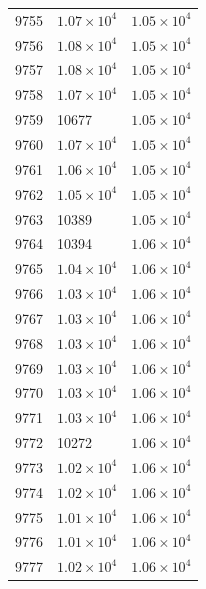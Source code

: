 \begin{table}[H]
\begin{tabular}{lll}
9755 & $\displaystyle 1.07 \times 10^{4}$ & $\displaystyle 1.05 \times 10^{4}$ \\
9756 & $\displaystyle 1.08 \times 10^{4}$ & $\displaystyle 1.05 \times 10^{4}$ \\
9757 & $\displaystyle 1.08 \times 10^{4}$ & $\displaystyle 1.05 \times 10^{4}$ \\
9758 & $\displaystyle 1.07 \times 10^{4}$ & $\displaystyle 1.05 \times 10^{4}$ \\
9759 & 10677 & $\displaystyle 1.05 \times 10^{4}$ \\
9760 & $\displaystyle 1.07 \times 10^{4}$ & $\displaystyle 1.05 \times 10^{4}$ \\
9761 & $\displaystyle 1.06 \times 10^{4}$ & $\displaystyle 1.05 \times 10^{4}$ \\
9762 & $\displaystyle 1.05 \times 10^{4}$ & $\displaystyle 1.05 \times 10^{4}$ \\
9763 & 10389 & $\displaystyle 1.05 \times 10^{4}$ \\
9764 & 10394 & $\displaystyle 1.06 \times 10^{4}$ \\
9765 & $\displaystyle 1.04 \times 10^{4}$ & $\displaystyle 1.06 \times 10^{4}$ \\
9766 & $\displaystyle 1.03 \times 10^{4}$ & $\displaystyle 1.06 \times 10^{4}$ \\
9767 & $\displaystyle 1.03 \times 10^{4}$ & $\displaystyle 1.06 \times 10^{4}$ \\
9768 & $\displaystyle 1.03 \times 10^{4}$ & $\displaystyle 1.06 \times 10^{4}$ \\
9769 & $\displaystyle 1.03 \times 10^{4}$ & $\displaystyle 1.06 \times 10^{4}$ \\
9770 & $\displaystyle 1.03 \times 10^{4}$ & $\displaystyle 1.06 \times 10^{4}$ \\
9771 & $\displaystyle 1.03 \times 10^{4}$ & $\displaystyle 1.06 \times 10^{4}$ \\
9772 & 10272 & $\displaystyle 1.06 \times 10^{4}$ \\
9773 & $\displaystyle 1.02 \times 10^{4}$ & $\displaystyle 1.06 \times 10^{4}$ \\
9774 & $\displaystyle 1.02 \times 10^{4}$ & $\displaystyle 1.06 \times 10^{4}$ \\
9775 & $\displaystyle 1.01 \times 10^{4}$ & $\displaystyle 1.06 \times 10^{4}$ \\
9776 & $\displaystyle 1.01 \times 10^{4}$ & $\displaystyle 1.06 \times 10^{4}$ \\
9777 & $\displaystyle 1.02 \times 10^{4}$ & $\displaystyle 1.06 \times 10^{4}$ \\

\end{tabular}
\end{table}
